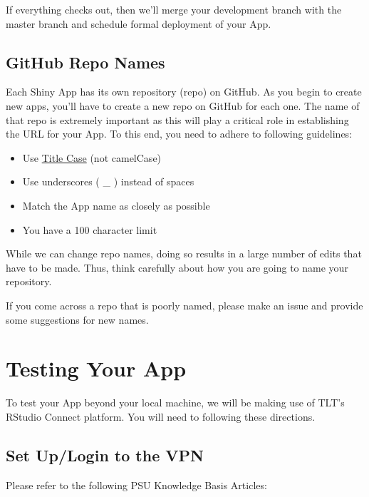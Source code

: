 \documentclass[
]{book}
\providecommand{\tightlist}{%
  \setlength{\itemsep}{0pt}\setlength{\parskip}{0pt}}
\begin{document}
If everything checks out, then we'll merge your development branch with the master branch and schedule formal deployment of your App.

\hypertarget{repo-naming}{%
\subsection{GitHub Repo Names}\label{repo-naming}}

Each Shiny App has its own repository (repo) on GitHub. As you begin to create new apps, you'll have to create a new repo on GitHub for each one. The name of that repo is extremely important as this will play a critical role in establishing the URL for your App. To this end, you need to adhere to following guidelines:

\begin{itemize}
\tightlist
\item
  Use \href{https://en.wikipedia.org/wiki/Letter_case\#Title_case}{Title Case} (not camelCase)
\item
  Use underscores ( \_ ) instead of spaces
\item
  Match the App name as closely as possible
\item
  You have a 100 character limit
\end{itemize}

While we can change repo names, doing so results in a large number of edits that have to be made. Thus, think carefully about how you are going to name your repository.

If you come across a repo that is poorly named, please make an issue and provide some suggestions for new names.

\hypertarget{testing}{%
\section{Testing Your App}\label{testing}}

To test your App beyond your local machine, we will be making use of TLT's RStudio Connect platform. You will need to following these directions.

\hypertarget{set-uplogin-to-the-vpn}{%
\subsection{Set Up/Login to the VPN}\label{set-uplogin-to-the-vpn}}

Please refer to the following PSU Knowledge Basis Articles:
\end{document}
